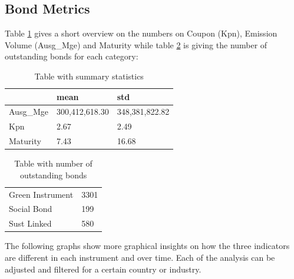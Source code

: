 \documentclass[12pt, a4paper]{article}
\begin{document}
\subsection{Bond Metrics}

Table \ref{table:1} gives a short overview on the numbers on Coupon (Kpn), Emission Volume (Ausg\_Mge) and Maturity while table \ref{table:2} is giving the number of outstanding bonds for each category:

\begin{table}[htbp]
\centering
\begin{tabular}{lll}
    \toprule
    {} & mean & std \\
    \midrule
    Ausg\_Mge & 300,412,618.30 & 348,381,822.82 \\
    Kpn & 2.67 & 2.49 \\
    Maturity & 7.43 & 16.68 \\
    \bottomrule
\end{tabular}
\caption{Table with summary statistics}
\label{table:1}
\end{table}

\begin{table}[htbp]
\centering
\begin{tabular}{ll}
\toprule
Green Instrument & 3301 \\
Social Bond & 199 \\
Sust Linked & 580 \\
\bottomrule
\end{tabular}
\caption{Table with number of outstanding bonds}
\label{table:2}
\end{table}

The following graphs show more graphical insights on how the three indicators are different in each instrument and over time. Each of the analysis can be adjusted and filtered for a certain country or industry.
\end{document}
